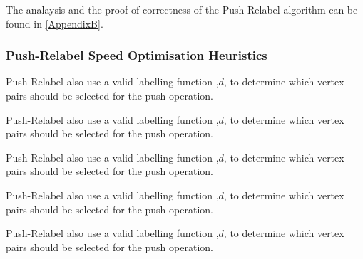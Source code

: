 The analaysis and the proof of correctness of the Push-Relabel algorithm can be found in \autoref{AppendixB}.


\subsubsection{Push-Relabel Speed Optimisation Heuristics}
\begin{definition}[Discharge]
	Push-Relabel also use a valid labelling function ,$d$, to determine which vertex pairs should be selected for the push operation.
\end{definition}

\begin{definition}[FIFO]
	Push-Relabel also use a valid labelling function ,$d$, to determine which vertex pairs should be selected for the push operation.
\end{definition}

\begin{definition}
	Push-Relabel also use a valid labelling function ,$d$, to determine which vertex pairs should be selected for the push operation.
\end{definition}

\begin{definition}
	Push-Relabel also use a valid labelling function ,$d$, to determine which vertex pairs should be selected for the push operation.
\end{definition}

\begin{definition}
	Push-Relabel also use a valid labelling function ,$d$, to determine which vertex pairs should be selected for the push operation.
\end{definition}
